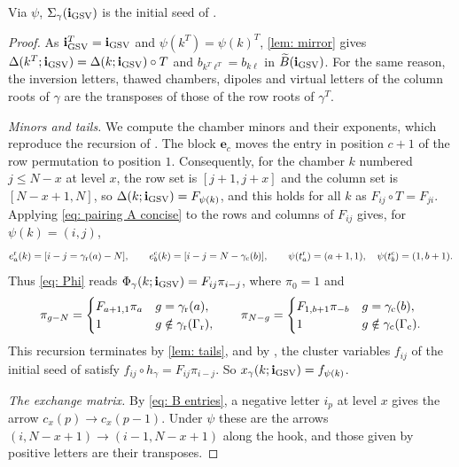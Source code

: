 \documentclass[a4paper]{amsart}
\numberwithin{equation}{section}
\theoremstyle{definition}
\theoremstyle{remark}
\newcommand{\bfi}{\mathbf{i}}
\newcommand{\tB}{\widetilde{B}}
\newcommand{\rr}{{\rm r}}
\newcommand{\cc}{{\rm c}}
\begin{document}
\begin{proposition}
  \label{prop: base case concise}
  Via $\psi$, $\Sigma_\gamma(\bfi_{\rm GSV})$ is the initial seed of \cite[Theorem~4.11]{GSV23}.
\end{proposition}
\begin{proof}
  As $\bfi_{\rm GSV}^T=\bfi_{\rm GSV}$ and $\psi(k^T)=\psi(k)^T$, \cref{lem: mirror} gives $\Delta(k^T;\bfi_{\rm GSV})=\Delta(k;\bfi_{\rm GSV})\circ T$ and $b_{k^T\ell^T}=b_{k\ell}$ in $\tB(\bfi_{\rm GSV})$.
  For the same reason, the inversion letters, thawed chambers, dipoles and virtual letters of the column roots of $\gamma$ are the transposes of those of the row roots of $\gamma^T$.

  \emph{Minors and tails.}
We compute the chamber minors and their exponents, which reproduce the recursion of \cite{GSV23}.
  The block $\mathbf e_c$ moves the entry in position $c+1$ of the row permutation to position $1$.
  Consequently, for the chamber $k$ numbered $j\le N-x$ at level $x$, the row set is $[j+1,j+x]$ and the column set is $[N-x+1,N]$, so $\Delta(k;\bfi_{\rm GSV})=F_{\psi(k)}$, and this holds for all $k$ as $F_{ij}\circ T=F_{ji}$.
  Applying \eqref{eq: pairing A concise} to the rows and columns of $F_{ij}$ gives, for $\psi(k)=(i,j)$,
  \[
    e^\rr_a(k)=[i-j=\gamma_{\rr}(a)-N],\qquad
    e^\cc_b(k)=[i-j=N-\gamma_{\cc}(b)],
    \qquad
    \psi(t^\rr_a)=(a+1,1),\quad \psi(t^\cc_b)=(1,b+1).
  \]
  Thus \eqref{eq: Phi} reads $\Phi_\gamma(k;\bfi_{\rm GSV})=F_{ij}\pi_{i-j}$, where $\pi_0=1$ and
  \begin{equation}
    \label{eq: tails recursion concise}
    \pi_{g-N}=\begin{cases}F_{a+1,1}\pi_a&g=\gamma_{\rr}(a),\\1&g\notin\gamma_{\rr}(\Gamma_{\rr}),\end{cases}
    \qquad
    \pi_{N-g}=\begin{cases}F_{1,b+1}\pi_{-b}&g=\gamma_{\cc}(b),\\1&g\notin\gamma_{\cc}(\Gamma_{\cc}).
    \end{cases}
  \end{equation}
  This recursion terminates by \cref{lem: tails}, and by \cite[Theorem~4.4, (4.1), and (4.6)]{GSV23}, the cluster variables $f_{ij}$ of the initial seed of \cite[Theorem~4.11]{GSV23} satisfy $f_{ij}\circ h_\gamma=F_{ij}\pi_{i-j}$.
  So $x_\gamma(k;\bfi_{\rm GSV})=f_{\psi(k)}$.

  \emph{The exchange matrix.}
  By \eqref{eq: B entries}, a negative letter $i_p$ at level $x$ gives the arrow $c_x(p)\to c_x(p-1)$.
  Under $\psi$ these are the arrows $(i,N-x+1)\to(i-1,N-x+1)$ along the hook, and those given by positive letters are their transposes.


\end{proof}
\end{document}
